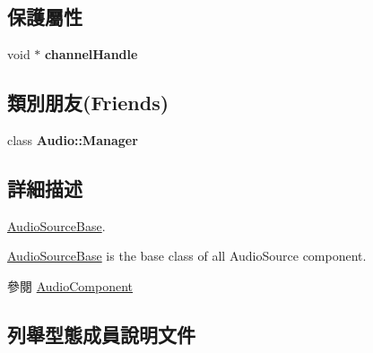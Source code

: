 \subsection*{保護屬性}
\begin{DoxyCompactItemize}
\item 
void $\ast$ {\bfseries channel\+Handle}\hypertarget{class_magnum_1_1_audio_source_base_a699d212dc17d35476990ff6b7900bc70}{}\label{class_magnum_1_1_audio_source_base_a699d212dc17d35476990ff6b7900bc70}

\end{DoxyCompactItemize}
\subsection*{類別朋友(Friends)}
\begin{DoxyCompactItemize}
\item 
class {\bfseries Audio\+::\+Manager}\hypertarget{class_magnum_1_1_audio_source_base_a3ad7b469f47b268897de410969c1c7cd}{}\label{class_magnum_1_1_audio_source_base_a3ad7b469f47b268897de410969c1c7cd}

\end{DoxyCompactItemize}


\subsection{詳細描述}
\hyperlink{class_magnum_1_1_audio_source_base}{Audio\+Source\+Base}. 

\hyperlink{class_magnum_1_1_audio_source_base}{Audio\+Source\+Base} is the base class of all Audio\+Source component. \begin{DoxySeeAlso}{參閱}
\hyperlink{class_magnum_1_1_audio_component}{Audio\+Component} 
\end{DoxySeeAlso}


\subsection{列舉型態成員說明文件}
